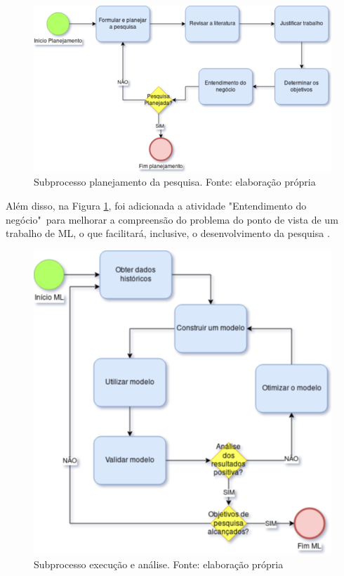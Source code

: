 \begin{figure}[ht]
	\centering
    \includegraphics[keepaspectratio=true,scale=0.5]{figuras/subprocessoPlanejamento}
	\caption[Subprocesso planejamento da pesquisa]{Subprocesso planejamento da pesquisa. Fonte: elaboração própria}
	\label{fig:subprocessoPlanejamento}
\end{figure}

Além disso, na Figura \ref{fig:subprocessoPlanejamento}, foi adicionada a atividade "Entendimento do negócio"\ para melhorar a compreensão do problema do ponto de vista de um trabalho de ML, o que facilitará, inclusive, o desenvolvimento da pesquisa \cite{crowston_comparing_2017}.

\begin{figure}[ht]
	\centering
    \includegraphics[keepaspectratio=true,scale=0.5]{figuras/subprocessoAnalise}
	\caption[Subprocesso execução e análise]{Subprocesso execução e análise. Fonte: elaboração própria}
	\label{fig:subprocessoAnalise}
\end{figure}

